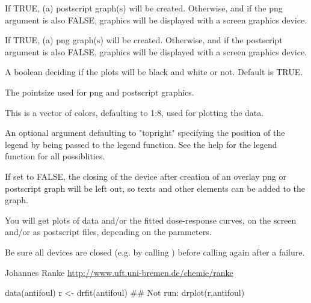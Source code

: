 \begin{Arguments}
\begin{ldescription}
\item[\code{postscript}] If TRUE, (a) postscript graph(s) will be created. Otherwise, and if 
the png argument is also FALSE, graphics will be
displayed with a screen graphics device.

\item[\code{png}] If TRUE, (a) png graph(s) will be created. Otherwise, and if the
postscript argument is also FALSE, graphics will be displayed with a
screen graphics device.

\item[\code{bw}] A boolean deciding if the plots will be black and white or not. Default 
is TRUE.

\item[\code{pointsize}] The pointsize used for png and postscript graphics.

\item[\code{colors}] This is a vector of colors, defaulting to 1:8, used for plotting the data.

\item[\code{lpos}] An optional argument defaulting to "topright" specifying the position
of the legend by being passed to the legend function. See the help for the
legend function for all possiblities.
\item[\code{devoff}] If set to FALSE, the closing of the device after creation of an overlay png
or postscript graph will be left out, so texts and other elements can be 
added to the graph.

\end{ldescription}
\end{Arguments}
\begin{Value}
\begin{ldescription}
\item[\code{results}] You will get plots of data and/or the fitted dose-response curves, on the
screen and/or as postscript files, depending on the parameters.

\end{ldescription}
\end{Value}
\begin{Note}\relax
Be sure all devices are closed (e.g. by calling ) before
calling  again after a failure.
\end{Note}
\begin{Author}\relax
Johannes Ranke 
\url{http://www.uft.uni-bremen.de/chemie/ranke}
\end{Author}
\begin{Examples}
\begin{ExampleCode}
data(antifoul)
r <- drfit(antifoul)
## Not run: drplot(r,antifoul)
\end{ExampleCode}
\end{Examples}

